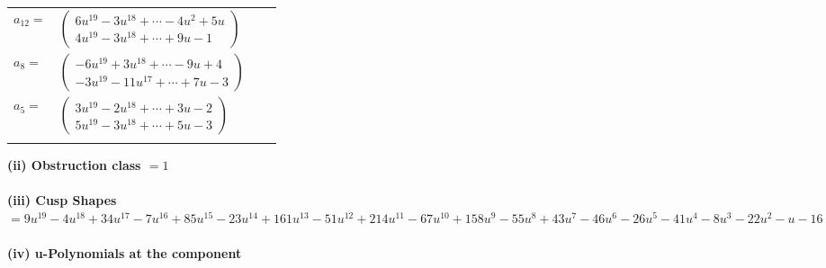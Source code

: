 \documentclass[1p]{elsarticle_modified}
\theoremstyle{definition}
\begin{document}
\begin{tabular}{m{7pt} m{180pt} m{7pt} m{180pt} }
\flushright $a_{12}=$&$\begin{pmatrix}6 u^{19}-3 u^{18}+\cdots-4 u^2+5 u\\4 u^{19}-3 u^{18}+\cdots+9 u-1\end{pmatrix}$ \\
\flushright $a_{8}=$&$\begin{pmatrix}-6 u^{19}+3 u^{18}+\cdots-9 u+4\\-3 u^{19}-11 u^{17}+\cdots+7 u-3\end{pmatrix}$ \\
\flushright $a_{5}=$&$\begin{pmatrix}3 u^{19}-2 u^{18}+\cdots+3 u-2\\5 u^{19}-3 u^{18}+\cdots+5 u-3\end{pmatrix}$\\&\end{tabular}
\flushleft \textbf{(ii) Obstruction class $= 1$}\\~\\
\flushleft \textbf{(iii) Cusp Shapes $= 9 u^{19}-4 u^{18}+34 u^{17}-7 u^{16}+85 u^{15}-23 u^{14}+161 u^{13}-51 u^{12}+214 u^{11}-67 u^{10}+158 u^9-55 u^8+43 u^7-46 u^6-26 u^5-41 u^4-8 u^3-22 u^2- u-16$}\\~\\
\newpage\renewcommand{\arraystretch}{1}
\flushleft \textbf{(iv) u-Polynomials at the component}\newline \\
\end{document}
